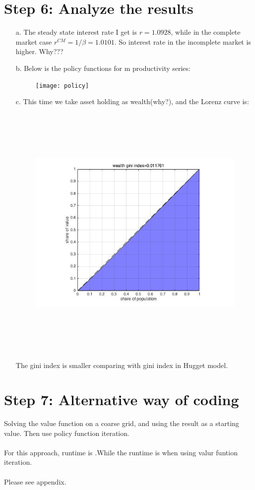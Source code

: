 \documentclass[12pt]{article}
\begin{document}
\section{Step 6: Analyze the results}
\begin{enumerate}


	\item [a.] The steady state interest rate I get is $r=1.0928$, while in the complete market case $r^{CM}=1/\beta=1.0101$. So interest rate in the incomplete market is higher. Why???
    \item [b.] Below is the policy functions for m productivity series:
    \begin{figure}[!h]\centering
	\texttt{[image: policy]}
    \end{figure}
    \item [c.]This time we take asset holding as wealth(why?), and the Lorenz curve is:
    \begin{figure}[!h]\centering
    	\includegraphics[width=5in,height=5in]{wgini}
    \end{figure}
    \newline The gini index is smaller comparing with gini index in Hugget model.
\end{enumerate}
\section{Step 7: Alternative way of coding}
Solving the value function on a coarse grid, and using the result as a starting value. Then use policy function iteration.\\\\
For this approach, runtime is  .While the runtime is  when using valur funtion iteration.\\\\
Please see appendix.
\end{document}
